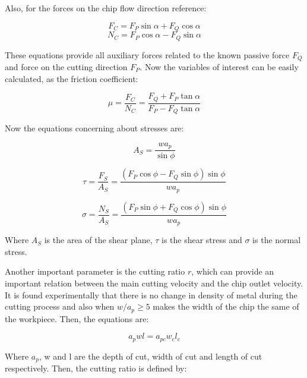 	Also, for the forces on the chip flow direction reference:

	\begin{equation} 
	\label{}
	F_{C} = F_{P}\sin\alpha + F_{Q}\cos\alpha
	\end{equation}
	\begin{equation} 
	\label{}
	N_{C} = F_{P}\cos\alpha - F_{Q}\sin\alpha
	\end{equation}

	These equations provide all auxiliary forces related to the known passive force $F_{Q}$ and force on the cutting direction $F_{P}$. Now the variables of interest can be easily calculated, as the friction coefficient:

	\begin{equation} 
	\label{eq_friction}
	\mu = \frac{F_{C}}{N_{C}} = \frac{F_{Q} + F_{P}\tan\alpha}{F_{P} - F_{Q}\tan\alpha}
	\end{equation}

	Now the equations concerning about stresses are:

	\begin{equation} 
	\label{}
	A_{S} = \frac{wa_{p}}{\sin\phi}
	\end{equation}

	\begin{equation} 
	\label{}
	\tau = \frac{F_{S}}{A_{S}} = \frac{(F_{P}\cos\phi - F_{Q}\sin\phi)\sin\phi}{wa_{p}}
	\end{equation}

	\begin{equation} 
	\label{}
	\sigma = \frac{N_{S}}{A_{S}} = \frac{(F_{P}\sin\phi + F_{Q}\cos\phi)\sin\phi}{wa_{p}}
	\end{equation}

	Where $A_{S}$ is the area of the shear plane, $\tau$ is the shear stress and $\sigma$ is the normal stress.

	Another important parameter is the cutting ratio $r$, which can provide an important relation between the main cutting velocity and the chip outlet velocity. It is found experimentally that there is no change in density of metal during the cutting process and also when $w/a_{p} \geq 5$ makes the width of the chip the same of the workpiece. Then, the equations are:

	\begin{equation} 
	\label{}
	a_{p}wl = a_{pc}w_{c}l_{c}
	\end{equation}

	Where $a_{p}$, w and l are the depth of cut, width of cut and length of cut respectively. Then, the cutting ratio is defined by:


